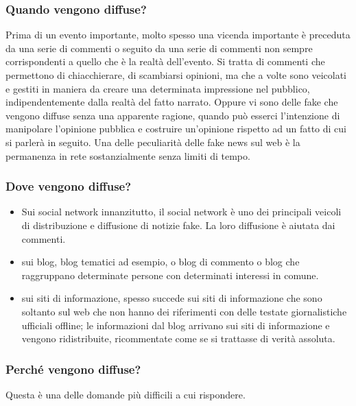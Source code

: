\subsubsection{Quando vengono diffuse?}

Prima di un evento importante, molto spesso una vicenda importante è preceduta da una serie di commenti o seguito da una serie di commenti non sempre corrispondenti a quello che è la realtà dell'evento. Si tratta di commenti che permettono di chiacchierare, di scambiarsi opinioni, ma che a volte sono veicolati e gestiti in maniera da creare una determinata impressione nel pubblico, indipendentemente dalla realtà del fatto narrato.
Oppure vi sono delle fake che vengono diffuse senza una apparente ragione, quando può esserci l'intenzione di manipolare l'opinione pubblica e costruire un'opinione rispetto ad un fatto di cui si parlerà in seguito. 
Una delle peculiarità delle fake news sul web è la permanenza in rete sostanzialmente senza limiti di tempo. 

\subsubsection{Dove vengono diffuse?}

\begin{itemize}
    \item Sui social network innanzitutto, il social network è uno dei principali veicoli di distribuzione e diffusione di notizie fake. La loro diffusione è aiutata dai commenti.
    \item sui blog, blog tematici ad esempio, o blog di commento o blog che raggruppano determinate persone con determinati interessi in comune. 
    \item sui siti di informazione, spesso succede sui siti di informazione che sono soltanto sul web che non hanno dei riferimenti con delle testate giornalistiche ufficiali offline; le informazioni dal blog arrivano sui siti di informazione e vengono ridistribuite, ricommentate come se si trattasse di verità assoluta.
\end{itemize}

\subsubsection{Perché vengono diffuse?} 
Questa è una delle domande più difficili a cui rispondere.

